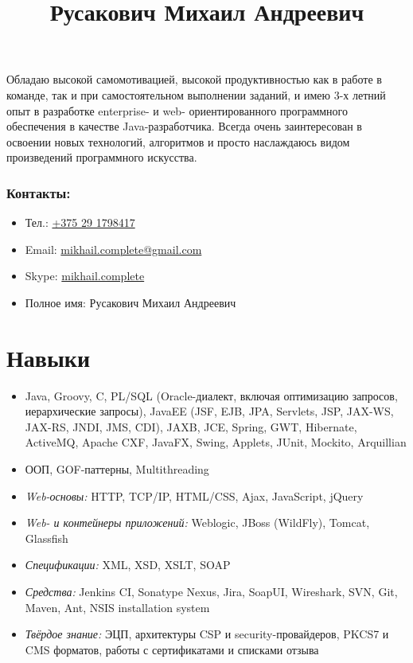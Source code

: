 \documentclass[a4paper, 12pt]{article}
\title{Русакович Михаил Андреевич}
\author{}
\date{}
\newcommand{\itemlabel}[1]{
    \textit{#1:}}
\begin{document}
\maketitle

Обладаю высокой самомотивацией, высокой продуктивностью как в работе в команде, так и при самостоятельном выполнении заданий, и имею 3-х летний опыт в разработке enterprise- и web- ориентированного программного обеспечения в качестве Java-разработчика.\newline
Всегда очень заинтересован в освоении новых технологий, алгоритмов и просто наслаждаюсь видом произведений программного искусства. 

\subsubsection*{Контакты:}
\begin{itemize}
    \item Тел.: \href{tel:+375291798417}{+375 29 1798417}
    \item Email: \href{mailto:mikhail.complete@gmail.com}{mikhail.complete@gmail.com}
    \item Skype: \href{callto:mikhail.complete}{mikhail.complete}
    \item Полное имя: Русакович Михаил Андреевич
\end{itemize}


\section*{Навыки}

    \begin{itemize}
        \item Java, Groovy, C, PL/SQL (Oracle-диалект, включая оптимизацию запросов, иерархические запросы), JavaEE (JSF, EJB, JPA, Servlets, JSP, JAX-WS, JAX-RS, JNDI, JMS, CDI), JAXB, JCE, Spring, GWT, Hibernate, ActiveMQ, Apache CXF, JavaFX, Swing, Applets, JUnit, Mockito, Arquillian
        \item ООП, GOF-паттерны, Multithreading
        \item \itemlabel{Web-основы} HTTP, TCP/IP, HTML/CSS, Ajax, JavaScript, jQuery
        \item \itemlabel{Web- и контейнеры приложений} Weblogic, JBoss (WildFly), Tomcat, Glassfish
        \item \itemlabel{Спецификации} XML, XSD, XSLT, SOAP
        \item \itemlabel{Средства} Jenkins CI, Sonatype Nexus, Jira, SoapUI, Wireshark, SVN, Git, Maven, Ant, NSIS installation system
        \item \itemlabel{Твёрдое знание} ЭЦП, архитектуры CSP и security-провайдеров, PKCS7 и CMS форматов, работы с сертификатами и списками отзыва
    \end{itemize}
\end{document}
